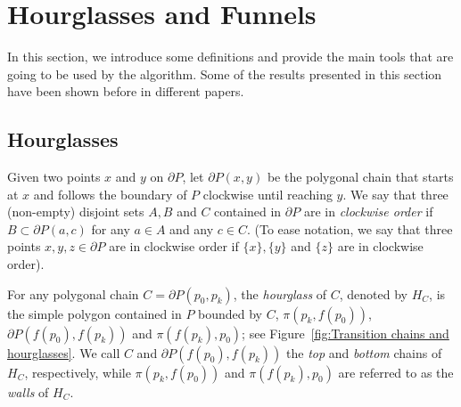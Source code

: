 \documentclass[a4paper,UKenglish]{lipics}
\newcommand{\ff}[1]{\ensuremath{f(#1)}}
\newcommand{\p}[2]{\ensuremath{\pi(#1, #2)}}
\begin{document}
\section{Hourglasses and Funnels}
In this section, we introduce some definitions and provide the main tools that are going to be used by the algorithm. Some of the results presented in this section have been shown before in different papers. 

\subsection{Hourglasses}

Given two points $x$ and $y$ on $\partial P$, let $\partial P(x,y)$ be the polygonal chain that starts at $x$ and follows the boundary of $P$ clockwise until reaching $y$.
We say that three (non-empty) disjoint sets $A,B$ and $C$ contained in $\partial P$ are in \emph{clockwise order} if $B\subset \partial P(a,c)$ for any $a\in A$ and any $c\in C$. (To ease notation, we say that three points $x,y,z\in \partial P$ are in clockwise order if $\{x\}, \{y\}$ and $\{z\}$ are in clockwise order).

For any polygonal chain $C= \partial P(p_0, p_k)$, the \emph{hourglass} of $C$, denoted by $H_C$, is the simple polygon contained in $P$ bounded by $C$, $\p{p_k}{\ff{p_0}}$, $\partial P(\ff{p_0}, \ff{p_k})$ and $\p{\ff{p_k}}{ p_0}$; see Figure~\ref{fig:Transition chains and hourglasses}. 
We call $C$ and $\partial P(\ff{p_0}, \ff{p_k})$ the \emph{top} and \emph{bottom} chains of $H_C$, respectively, while $\p{p_k}{ \ff{p_0}}$ and $\p{\ff{p_k}}{p_0}$ are referred to as the \emph{walls} of $H_C$.
\end{document}

